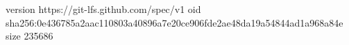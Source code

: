 version https://git-lfs.github.com/spec/v1
oid sha256:0e436785a2aac110803a40896a7e20ce906fde2ae48da19a54844ad1a968a84e
size 235686
